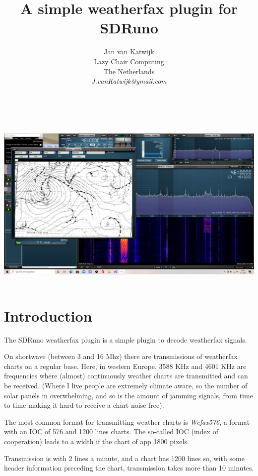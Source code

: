 \documentclass[11pt]{article}
\begin{document}
\title{A simple weatherfax plugin for SDRuno}
\author{
Jan van Katwijk\\
Lazy Chair Computing \\
The Netherlands\\
{\em J.vanKatwijk@gmail.com}}
\maketitle
\ \\
\ \\
\includegraphics[width=140mm]{wfax-example.png}
\ \\
\section{Introduction}
The SDRuno weatherfax plugin is a simple plugin to decode weatherfax signals.

On shortwave (between 3 and 16 Mhz) there are
transmissions of weatherfax charts on a regular base.
Here, in western Europe, 3588 KHz and 4601 KHz are frequencies where
(almost) continuously weather charts are transmitted and can be received.
(Where I live people are extremely climate aware, so the number of
solar panels in overwhelming, and so is the amount of jamming signals,
from time to time making it hard to receive a chart noise free).

The most common format for transmitting weather charts is
{\em Wefax576}, a format with an IOC of 576 and 1200 lines charts.
The so-called IOC
(index of cooperation) leads to a width if the chart of
app 1800 pixels.

Transmission is with 2 lines a minute, and a chart has 1200 lines
so, with some header information preceding the chart, transmission
takes more than 10 minutes.
\end{document}
